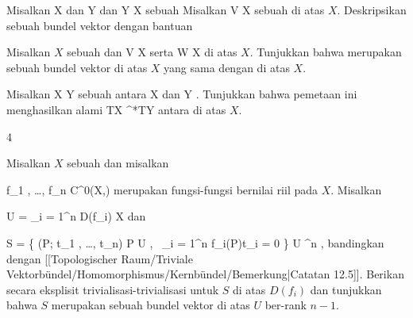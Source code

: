 {}
{

Misalkan
\mathkor {} {X} {dan} {Y} {}
dan
\maabb {\varphi} {Y} {X
} {}
sebuah
Misalkan
 {V} {X
} {}
sebuah
di atas $X$. Deskripsikan
sebuah bundel vektor dengan bantuan

}
{} {}

{}
{

Misalkan $X$ sebuah
dan
 { V } { X
} {}
serta
 { W } { X
} {}
di atas $X$. Tunjukkan bahwa
 {} {}
merupakan sebuah bundel vektor di atas $X$ yang sama dengan
di atas $X$.

}
{} {}

{}
{

Misalkan
\maabb {\varphi} { X } { Y
} {}
sebuah
antara
\mathkor {} {X} {dan} {Y} {.}
Tunjukkan bahwa pemetaan ini menghasilkan
alami
 {TX} { \varphi^*TY
} {}
antara
di atas $X$.

}
{} {}


{4}
{

Misalkan $X$ sebuah
dan misalkan

\mavergleichskette
{\vergleichskette
{ f_1 , \ldots , f_n
}
{ \in }{ C^0(X,\R)
}
{  }{
}
{    }{
}
{   }{
}
}
{}{}{}
merupakan fungsi-fungsi bernilai riil
pada $X$. Misalkan

\mavergleichskette
{\vergleichskette
{ U
}
{ = }{ \bigcup_{i = 1}^n D(f_i)
}
{ \subseteq }{ X
}
{    }{
}
{   }{
}
}
{}{}{}
dan

\mavergleichskettedisp
{\vergleichskette
{ S
}
{ =} { \left\{ (P; t_1 , \ldots , t_n)  \mid  P \in U , \,  \sum_{i = 1}^n f_i(P)t_i = 0       \right\}
}
{ \subseteq} { U \times \R^n
}
{ } {
}
{ } {
}
}
{}{}{,}
bandingkan dengan
[[Topologischer Raum/Triviale Vektorbündel/Homomorphismus/Kernbündel/Bemerkung|Catatan 12.5]].
Berikan secara eksplisit trivialisasi-trivialisasi untuk $S$ di atas $D(f_i)$ dan tunjukkan bahwa $S$ merupakan sebuah bundel vektor di atas $U$ ber-rank $n-1$.

}
{} {}

